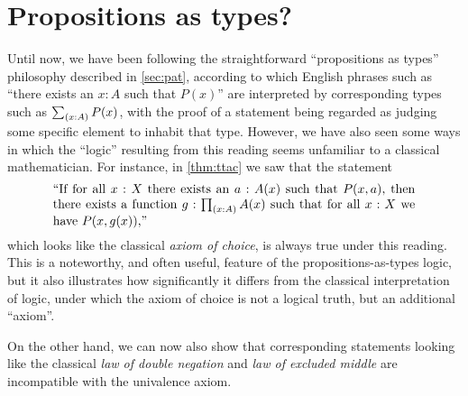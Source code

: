 %

\section{Propositions as types?}
\label{subsec:pat?}

%
%
%
Until now, we have been following the straightforward ``propositions as types'' philosophy described in \autoref{sec:pat}, according to which English phrases such as ``there exists an $x:A$ such that $P(x)$'' are interpreted by corresponding types such as $\sm{x:A} P(x)$, with the proof of a statement being regarded as judging some specific element to inhabit that type.
However, we have also seen some ways in which the ``logic'' resulting from this reading seems unfamiliar to a classical mathematician.
For instance, in \autoref{thm:ttac} we saw that the statement
%
\begin{equation}\label{eq:english-ac}
  \parbox{\textwidth-2cm}{``If for all $x:X$ there exists an $a:A(x)$ such that $P(x,a)$, then there exists a function $g:\prd{x:A} A(x)$ such that for all $x:X$ we have $P(x,g(x))$,''}
\end{equation}
which looks like the classical \emph{axiom of choice}, is always true under this reading. This is a noteworthy, and often useful, feature of the propositions-as-types logic, but it also illustrates how significantly it differs from the classical interpretation of logic, under which the axiom of choice is not a logical truth, but an additional ``axiom''.

On the other hand, we can now also show that corresponding statements looking like the classical \emph{law of double negation} and \emph{law of excluded middle} are incompatible with the univalence axiom.
%

